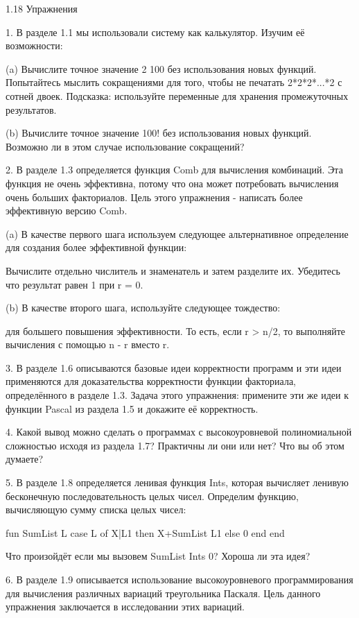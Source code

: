 1.18 Упражнения

1. В разделе 1.1 мы использовали систему как калькулятор. Изучим её возможности:

(a) Вычислите точное значение 2 100 без использования новых функций. Попытайтесь мыслить сокращениями для того, чтобы не печатать 2*2*2*...*2 с сотней двоек. Подсказка: используйте переменные для хранения промежуточных результатов.

(b) Вычислите точное значение 100! без использования новых функций. Возможно ли в этом случае использование сокращений?

2. В разделе 1.3 определяется функция Comb для вычисления комбинаций. Эта функция не очень эффективна, потому что она может потребовать вычисления очень больших факториалов. Цель этого упражнения - написать более эффективную версию Comb.

(a) В качестве первого шага используем следующее альтернативное определение для создания более эффективной функции:

Вычислите отдельно числитель и знаменатель и затем разделите их. Убедитесь что результат равен 1 при r = 0.

(b) В качестве второго шага, используйте следующее тождество:

для большего повышения эффективности. То есть, если r > n/2, то выполняйте вычисления с помощью n - r вместо r.

3. В разделе 1.6 описываются базовые идеи корректности программ и эти идеи применяются для доказательства корректности функции факториала, определённого в разделе 1.3. Задача этого упражнения: примените эти же идеи к функции Pascal из раздела 1.5 и докажите её корректность.

4. Какой вывод можно сделать о программах с высокоуровневой полиномиальной сложностью исходя из раздела 1.7? Практичны ли они или нет? Что вы об этом думаете?

5. В разделе 1.8 определяется ленивая функция Ints, которая вычисляет ленивую бесконечную последовательность целых чисел. Определим функцию, вычисляющую сумму списка целых чисел:

fun {SumList L}
case L of X|L1 then X+{SumList L1}
else 0 end
end

Что произойдёт если мы вызовем {SumList {Ints 0}}? Хороша ли эта идея?

6. В разделе 1.9 описывается использование высокоуровневого программирования для вычисления различных вариаций треугольника Паскаля. Цель данного упражнения заключается в исследовании этих вариаций.

